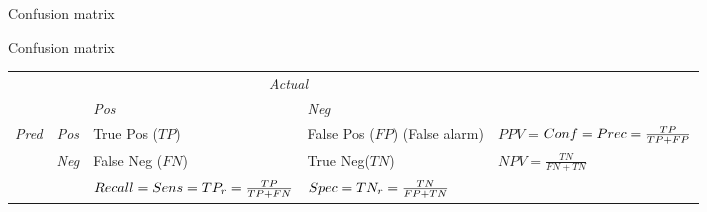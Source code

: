 \documentclass{beamer}
\begin{document}
\begin{frame}{Confusion matrix}

\alert{Confusion matrix} 

\begin{tabular}{cc||p{2.5cm}|p{2.5cm}||p{2.5cm}}
  & & \multicolumn{2}{c}{\emph{Actual}}\\
  & &    \emph{Pos} & \emph{Neg} \\
  \hline\hline
  \multirow{6}{*}{\emph{Pred}}
  &\emph{Pos} & True Pos \newline ($TP$)  &  False Pos \newline ($FP$)  \newline (False alarm) & $PPV=$\newline $Conf= \newline Prec=\frac{TP}{TP+FP}$ \\
  \cline{2-5}
  &\emph{Neg} & False Neg \newline  ($FN$)   &  True Neg\newline ($TN$) & $NPV=\frac{TN}{FN+TN}$\\
  \hline
  &  & $Recall=\newline Sens=\newline TP_r= \frac{TP}{TP+FN}$ & $Spec= \newline TN_r= \frac{TN}{FP+TN} $ & \\
\end{tabular}

\end{frame}
\end{document}
